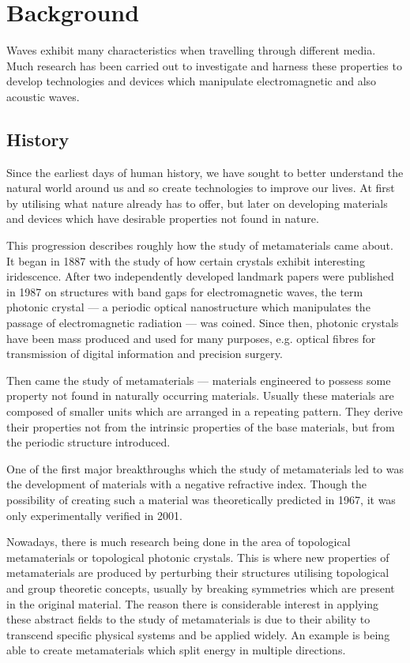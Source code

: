\chapter{Background}
Waves exhibit many characteristics when travelling through different media.
Much research has been carried out to investigate and harness these properties
to develop technologies and devices which manipulate electromagnetic and also
acoustic waves.

\section{History}
Since the earliest days of human history, we have sought to better understand
the natural world around us and so create technologies to improve our lives. At
first by utilising what nature already has to offer, but later on developing
materials and devices which have desirable properties not found in nature.

This progression describes roughly how the study of metamaterials came about.
It began in 1887 with the study of how certain crystals exhibit interesting
iridescence.\cite{pcearliest} After two independently developed landmark papers
were published in 1987 on structures with band gaps for electromagnetic
waves,\cite{pceli,pcjohn} the term photonic crystal --- a periodic optical
nanostructure which manipulates the passage of electromagnetic radiation ---
was coined.\cite{pcfocus} Since then, photonic crystals have been mass produced
and used for many purposes, e.g. optical fibres for transmission of digital
information \cite{pcopfib} and precision surgery.\cite{pcsurgery,pcneuro}

Then came the study of metamaterials --- materials engineered to possess some
property not found in naturally occurring materials.\cite{briefintro} Usually
these materials are composed of smaller units which are arranged in a repeating
pattern. They derive their properties not from the intrinsic properties of the
base materials, but from the periodic structure introduced.

One of the first major breakthroughs which the study of metamaterials led to
was the development of materials with a negative refractive index. Though the
possibility of creating such a material was theoretically predicted in
1967,\cite{negrefrac} it was only experimentally verified in
2001.\cite{negrefracex}

Nowadays, there is much research being done in the area of topological
metamaterials or topological photonic
crystals.\cite{topoedge,toposplit,topomet} This is where new properties of
metamaterials are produced by perturbing their structures utilising topological
and group theoretic concepts, usually by breaking symmetries which are present
in the original material. The reason there is considerable interest in applying
these abstract fields to the study of metamaterials is due to their ability to
transcend specific physical systems and be applied widely. An example is being
able to create metamaterials which split energy in multiple
directions.\cite{toposplit} 

